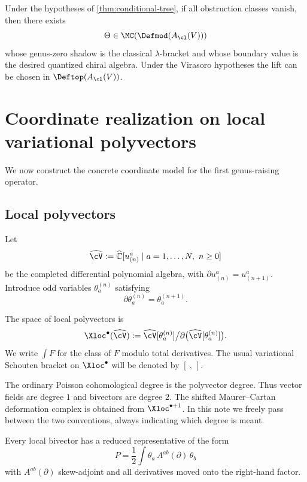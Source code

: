 \begin{corollary}
Under the hypotheses of \cref{thm:conditional-tree}, if all obstruction classes vanish,
then there exists
\[
\Theta\in \MC(\Defmod(A_{\cl}(V)))
\]
whose genus-zero shadow is the classical $\lambda$-bracket and whose boundary value is the
desired quantized chiral algebra. Under the Virasoro hypotheses the lift can be chosen in
$\Deftop(A_{\cl}(V))$.
\end{corollary}

\section{Coordinate realization on local variational polyvectors}

We now construct the concrete coordinate model for the first genus-raising operator.

\subsection{Local polyvectors}

Let
\[
\widehat{\cV}:=
\widehat{\mathbb C}[u^a_{(n)}\mid a=1,\dots,N,\ n\ge 0]
\]
be the completed differential polynomial algebra, with $\partial u^a_{(n)}=u^a_{(n+1)}$.
Introduce odd variables $\theta_a^{(n)}$ satisfying
\[
\partial \theta_a^{(n)}=\theta_a^{(n+1)}.
\]

\begin{definition}
The space of local polyvectors is
\[
\Xloc^\bullet(\widehat{\cV})
:=
\widehat{\cV}[\theta_a^{(n)}]\big/\partial\big(\widehat{\cV}[\theta_a^{(n)}]\big).
\]
We write $\int F$ for the class of $F$ modulo total derivatives. The usual variational
Schouten bracket on $\Xloc^\bullet$ will be denoted by $[\ ,\ ]$.
\end{definition}

\begin{remark}
The ordinary Poisson cohomological degree is the polyvector degree. Thus vector fields are
degree $1$ and bivectors are degree $2$. The shifted Maurer--Cartan deformation complex is
obtained from $\Xloc^{\bullet+1}$. In this note we freely pass between the two conventions,
always indicating which degree is meant.
\end{remark}

Every local bivector has a reduced representative of the form
\[
P=\frac12\int \theta_a\,A^{ab}(\partial)\,\theta_b
\]
with $A^{ab}(\partial)$ skew-adjoint and all derivatives moved onto the right-hand factor.

